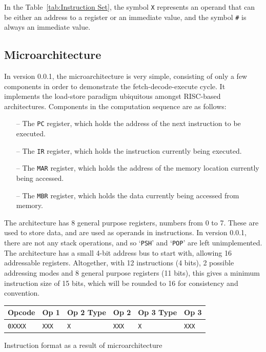 \documentclass[a4paper,11pt]{article}
\makeatletter
\newenvironment{tablehere}
  {\def\@captype{table}}
  {}
\makeatother
\begin{document}
In the Table~\ref{tab:Instruction Set}, the symbol \texttt{X} represents an operand that can be either an address to a register or an immediate value, and the symbol \texttt{\#} is always an immediate value.

\subsection{Microarchitecture}
\label{subsec:Microarchitecture}

In version 0.0.1, the microarchitecture is very simple, consisting of only a few components in order to demonstrate the fetch-decode-execute cycle. It implements the load-store paradigm ubiquitous amongst RISC-based architectures. Components in the computation sequence are as follows:

\begin{itemize}
  \item[--] The \texttt{PC} register, which holds the address of the next instruction to be executed.
  \item[--] The \texttt{IR} register, which holds the instruction currently being executed.
  \item[--] The \texttt{MAR} register, which holds the address of the memory location currently being accessed.
  \item[--] The \texttt{MBR} register, which holds the data currently being accessed from memory.
\end{itemize}

The architecture has 8 general purpose registers, numbers from 0 to 7. These are used to store data, and are used as operands in instructions. In version 0.0.1, there are not any stack operations, and so `\texttt{PSH}' and  `\texttt{POP}' are left unimplemented. The architecture has a small 4-bit address bus to start with, allowing 16 addressable registers. Altogether, with 12 instructions (4 bits), 2 possible addressing modes and 8 general purpose registers (11 bits)\footnotemark, this gives a minimum instruction size of 15 bits, which will be rounded to 16 for consistency and convention.


\begin{tablehere}
  \centering
  \begin{tabular}{@{}llllll@{}}
    \toprule
    \textbf{Opcode} & \textbf{Op 1} & \textbf{Op 2 Type} & \textbf{Op 2} & \textbf{Op 3 Type} & \textbf{Op 3} \\
    \midrule
    \texttt{0XXXX}  & \texttt{XXX}  & \texttt{X}         & \texttt{XXX}  & \texttt{X}         & \texttt{XXX}  \\
    \bottomrule
  \end{tabular}
  \label{tab:Instruction format as a result of microarchitecture}
  \caption{Instruction format as a result of microarchitecture}
\end{tablehere}
\end{document}
